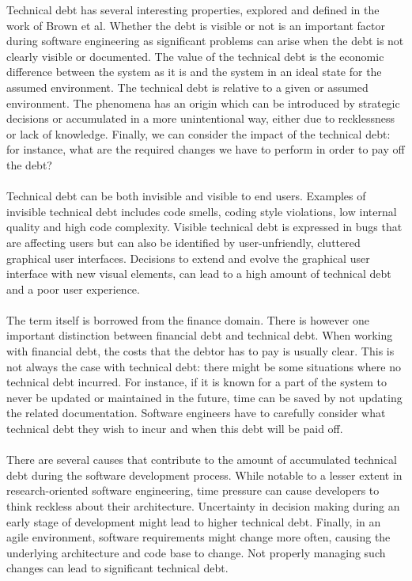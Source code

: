 Technical debt has several interesting properties, explored and defined in the work of Brown et al\cite{brown2010managing}. 
Whether the debt is visible or not is an important factor during software engineering as significant problems can arise when the debt is not clearly visible or documented.
The value of the technical debt is the economic difference between the system as it is and the system in an ideal state for the assumed environment.
The technical debt is relative to a given or assumed environment.
The phenomena has an origin which can be introduced by strategic decisions or accumulated in a more unintentional way, either due to recklessness or lack of knowledge.
Finally, we can consider the impact of the technical debt: for instance, what are the required changes we have to perform in order to pay off the debt?\\\\
Technical debt can be both invisible and visible to end users\cite{kruchten2012technical}.
Examples of invisible technical debt includes code smells, coding style violations, low internal quality and high code complexity.
Visible technical debt is expressed in bugs that are affecting users but can also be identified by user-unfriendly, cluttered graphical user interfaces.
Decisions to extend and evolve the graphical user interface with new visual elements, can lead to a high amount of technical debt and a poor user experience.\\\\
The term itself is borrowed from the finance domain\cite{guo2011portfolio}.
There is however one important distinction between financial debt and technical debt.
When working with financial debt, the costs that the debtor has to pay is usually clear.
This is not always the case with technical debt: there might be some situations where no technical debt incurred.
For instance, if it is known for a part of the system to never be updated or maintained in the future, time can be saved by not updating the related documentation.
Software engineers have to carefully consider what technical debt they wish to incur and when this debt will be paid off.\\\\
There are several causes that contribute to the amount of accumulated technical debt during the software development process\cite{martini2014architecture}. While notable to a lesser extent in research-oriented software engineering, time pressure can cause developers to think reckless about their architecture. Uncertainty in  decision making during an early stage of development might lead to higher technical debt. Finally, in an agile environment, software requirements might change more often, causing the underlying architecture and code base to change. Not properly managing such changes can lead to significant technical debt.\\\\
